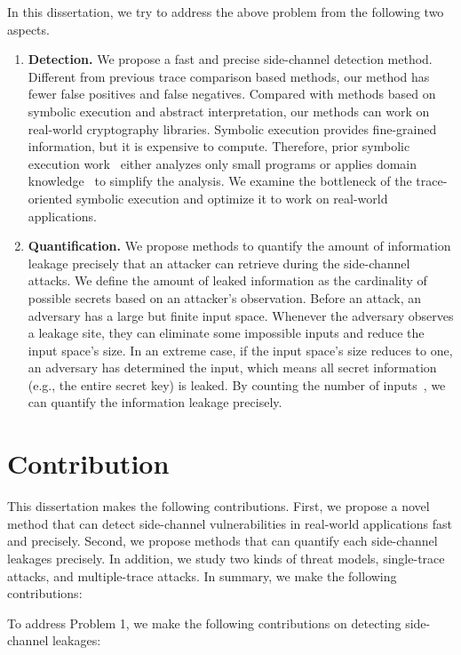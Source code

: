 In this dissertation, we try to address the above problem from the following two aspects.
\begin{enumerate}
    \item \textbf{Detection.} We propose a fast and precise side-channel detection method. Different from previous trace comparison based methods, our method has fewer false positives and false negatives. Compared with methods based on symbolic execution and abstract interpretation, our methods can work on real-world cryptography libraries. Symbolic execution provides fine-grained information, but it is expensive to compute. Therefore, prior symbolic execution work~\cite{203878,236338,Brotzman19Casym} either analyzes only small programs or applies domain knowledge~\cite{203878} to simplify the analysis. We examine the bottleneck of the trace-oriented symbolic execution and optimize it to work on real-world applications.
    \item \textbf{Quantification.} We propose methods to quantify the amount of information leakage precisely that an attacker can retrieve during the side-channel attacks. We define the amount of leaked information as the cardinality of possible secrets based on an attacker's observation. Before an attack, an adversary has a large but finite input space. Whenever the adversary observes a leakage site, they can eliminate some impossible inputs and reduce the input space's size. In an extreme case, if the input space's size reduces to one, an adversary has determined the input, which means all secret information (e.g., the entire secret key) is leaked. By counting the number of inputs~\cite{10.1007/11499107_24}, we can quantify the information leakage precisely. 
\end{enumerate}


\section{Contribution}
This dissertation makes the following contributions. First, we propose a novel method that can detect side-channel vulnerabilities in real-world applications fast and precisely. Second, we propose methods that can quantify each side-channel leakages precisely. In addition, we study two kinds of threat models, single-trace attacks, and multiple-trace attacks. In summary, we make the following contributions:

To address Problem 1, we make the following contributions on detecting side-channel leakages:

